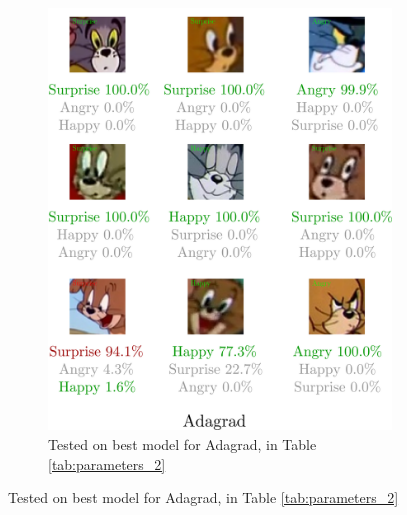 \documentclass[report, 11pt, oneside]{dissertation}
\begin{document}
\begin{figure}[h]
\begin{subfigure}{0.5\textwidth}
		\includegraphics[scale=0.125]{figure_37.pdf}
		\caption{\tiny{Tested on best model for Adagrad, in Table \ref{tab:parameters_2}}}
	\end{subfigure}
	\label{fig:emotion_classification_adagrad}
\end{figure}
\end{document}
